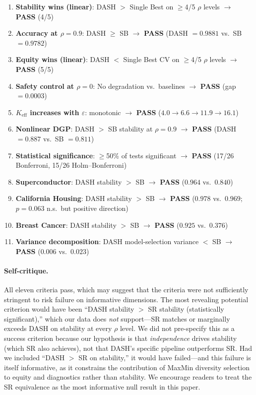\documentclass[11pt]{article}
\newcommand{\dash}{\textsc{DASH}}
\newcommand{\rhovar}{\rho}
\begin{document}
\begin{samepage}
\begin{enumerate}
  \item \textbf{Stability wins (linear)}: DASH $>$ Single Best on $\geq$4/5
    $\rhovar$ levels $\to$ \textbf{PASS} (4/5)
  \item \textbf{Accuracy at $\rhovar = 0.9$}: DASH $\geq$ SB $\to$
    \textbf{PASS} (DASH $= 0.9881$ vs.\ SB $= 0.9782$)
  \item \textbf{Equity wins (linear)}: DASH $<$ Single Best CV on $\geq$4/5
    $\rhovar$ levels $\to$ \textbf{PASS} (5/5)
  \item \textbf{Safety control at $\rhovar = 0$}: No degradation vs.\
    baselines $\to$ \textbf{PASS} (gap $= 0.0003$)
  \item \textbf{$K_{\text{eff}}$ increases with $\varepsilon$}: monotonic
    $\to$ \textbf{PASS} ($4.0 \to 6.6 \to 11.9 \to 16.1$)
  \item \textbf{Nonlinear DGP}: DASH $>$ SB stability at $\rhovar = 0.9$
    $\to$ \textbf{PASS} (DASH $= 0.887$ vs.\ SB $= 0.811$)
  \item \textbf{Statistical significance}: $\geq$50\% of tests significant
    $\to$ \textbf{PASS} (17/26 Bonferroni, 15/26 Holm--Bonferroni)
  \item \textbf{Superconductor}: DASH stability $>$ SB $\to$ \textbf{PASS}
    ($0.964$ vs.\ $0.840$)
  \item \textbf{California Housing}: DASH stability $>$ SB $\to$ \textbf{PASS}
    ($0.978$ vs.\ $0.969$; $p = 0.063$ n.s.\ but positive direction)
  \item \textbf{Breast Cancer}: DASH stability $>$ SB $\to$ \textbf{PASS}
    ($0.925$ vs.\ $0.376$)
  \item \textbf{Variance decomposition}: DASH model-selection variance $<$ SB
    $\to$ \textbf{PASS} ($0.006$ vs.\ $0.023$)
\end{enumerate}
\end{samepage}

\paragraph{Self-critique.}
All eleven criteria pass, which may suggest that the criteria were not
sufficiently stringent to risk failure on informative dimensions.  The
most revealing potential criterion would have been ``DASH stability $>$
SR stability (statistically significant),'' which our data does
\emph{not} support---SR matches or marginally exceeds DASH on stability
at every $\rhovar$ level.  We did not pre-specify this as a success
criterion because our hypothesis is that \emph{independence} drives
stability (which SR also achieves), not that \dash{}'s specific
pipeline outperforms SR.  Had we included ``DASH $>$ SR on stability,''
it would have failed---and this failure is itself informative, as it
constrains the contribution of MaxMin diversity selection to equity
and diagnostics rather than stability.  We encourage readers to treat
the SR equivalence as the most informative null result in this paper.
\end{document}
